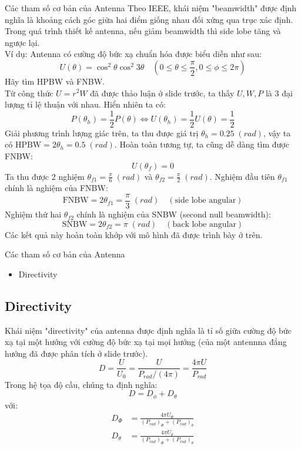 \documentclass[8pt]{beamer}
\begin{document}
\begin{frame}{Các tham số cơ bản của Antenna}
 Theo IEEE, khái niệm "beamwidth" được định nghĩa là khoảng cách góc giữa hai điểm giống nhau đối xứng qua trục xác định.
\\ Trong quá trình thiết kế antenna, nếu giảm beamwidth thì side lobe tăng và ngược lại. 
\\ Ví dụ: Antenna có cường độ bức xạ chuẩn hóa được biểu diễn như sau: 
$$U(\theta)=\cos^{2}{\theta}\cos^{2}{3\theta} \quad \left(0\leq\theta\leq\frac{\pi}{2},0\leq\phi\leq 2\pi\right)$$
Hãy tìm HPBW và FNBW.
\\ Từ công thức $U=r^2 W$ đã được thảo luận ở slide trước, ta thấy $U,W,P$ là 3 đại lượng tỉ lệ thuận với nhau. Hiển nhiên ta có:
$$P(\theta_{h})=\frac{1}{2}P(\theta)\Leftrightarrow U(\theta_{h})=\frac{1}{2}U(\theta)=\frac{1}{2}$$
Giải phương trình lượng giác trên, ta thu được giá trị $\theta_{h}=0.25\;(rad)$, vậy ta có $\text{HPBW}=2\theta_{h}=0.5\;(rad)$. Hoàn toàn tương tự, ta cũng dễ dàng tìm được FNBW:
$$U(\theta_{f})=0$$
Ta thu được 2 nghiệm $\theta_{f1}=\frac{\pi}{6}\;(rad)$ và $\theta_{f2}=\frac{\pi}{2}\;(rad)$. Nghiệm đầu tiên $\theta_{f1}$ chính là nghiệm của FNBW:
$$\text{FNBW}=2\theta_{f1}=\frac{\pi}{3}\;(rad)\quad (\text{side lobe angular})$$
Nghiệm thứ hai $\theta_{f2}$ chính là nghiệm của SNBW (second null beamwidth):
$$\text{SNBW}=2\theta_{f2}=\pi\;(rad)\quad (\text{back lobe angular})$$
Các kết quả này hoàn toàn khớp với mô hình đã được trình bày ở trên.
\end{frame}
\begin{frame}{Các tham số cơ bản của Antenna}
\begin{itemize}
	\item Directivity
\end{itemize}
\subsection{Directivity}
Khái niệm "directivity" của antenna được định nghĩa là tỉ số giữa cường độ bức xạ tại một hướng với cường độ bức xạ tại mọi hướng (của một antennna đẳng hướng đã được phân tích ở slide trước).
$$D=\frac{U}{U_{0}}=\frac{U}{P_{rad}/(4\pi)}=\frac{4\pi U}{P_{rad}}$$
Trong hệ tọa độ cầu, chúng ta định nghĩa: $$D=D_{\phi}+D_{\theta}$$
với: 
\begin{equation*}
\begin{split}
	D_{\Phi}&=\frac{4\pi U_{\Phi}}{(P_{rad})_{\Phi}+(P_{rad})_{\theta}}\\
	D_{\theta}&=\frac{4\pi U_{\theta}}{(P_{rad})_{\Phi}+(P_{rad})_{\theta}}
\end{split}
\end{equation*}
\end{frame}
\end{document}
